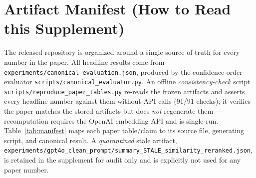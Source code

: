 \documentclass[11pt]{article}
\newcommand{\fpath}[1]{\mbox{}\nolinkurl{#1}}
\begin{document}
\section{Artifact Manifest (How to Read this Supplement)}\label{app:manifest}

The released repository is organized around a single source of truth for every number in the paper. All headline results come from \texttt{experiments/canonical\_evaluation.json}, produced by the confidence-order evaluator \texttt{scripts/canonical\_evaluator.py}. An offline \emph{consistency-check} script \texttt{scripts/reproduce\_paper\_tables.py} re-reads the frozen artifacts and asserts every headline number against them without API calls (91/91 checks); it verifies the paper matches the stored artifacts but does \emph{not} regenerate them --- recomputation requires the OpenAI embedding API and is single-run. Table~\ref{tab:manifest} maps each paper table/claim to its source file, generating script, and canonical result. A \emph{quarantined} stale artifact, \fpath{experiments/gpt4o_clean_prompt/summary_STALE_similarity_reranked.json}, is retained in the supplement for audit only and is explicitly not used for any paper number.
\end{document}
